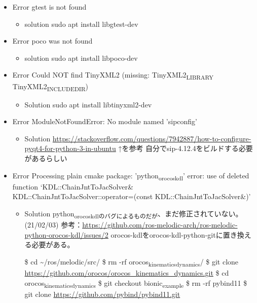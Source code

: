 \documentclass[11pt]{article}
\begin{document}
\begin{itemize}
\item Error
gtest is not found

\begin{itemize}
\item solution
sudo apt install libgtest-dev
\end{itemize}

\item Error
poco was not found

\begin{itemize}
\item solution
sudo apt install libpoco-dev
\end{itemize}

\item Error
Could NOT find TinyXML2 (missing: TinyXML2\textsubscript{LIBRARY} TinyXML2\textsubscript{INCLUDE}\textsubscript{DIR})

\begin{itemize}
\item Solution
sudo apt install libtinyxml2-dev
\end{itemize}

\item Error
ModuleNotFoundError: No module named 'sipconfig'

\begin{itemize}
\item Solution
\url{https://stackoverflow.com/questions/7942887/how-to-configure-pyqt4-for-python-3-in-ubuntu}
↑を参考
自分でsip-4.12.4をビルドする必要があるらしい
\end{itemize}

\item Error
Processing plain cmake package: 'python\textsubscript{orocos}\textsubscript{kdl}'
error: use of deleted function ‘KDL::ChainJntToJacSolver\& KDL::ChainJntToJacSolver::operator=(const KDL::ChainJntToJacSolver\&)’

\begin{itemize}
\item Solution
python\textsubscript{orocos}\textsubscript{kdlのバグによるものだが}、まだ修正されていない。(21/02/03)
参考：\url{https://github.com/ros-melodic-arch/ros-melodic-python-orocos-kdl/issues/2}
orocos-kdlをorocos-kdl-python-gitに置き換える必要がある。

\$ cd \textasciitilde{}/ros/melodic/src/
\$ rm -rf orocos\textsubscript{kinematics}\textsubscript{dynamics}/
\$ git clone \url{https://github.com/orocos/orocos\_kinematics\_dynamics.git}
\$ cd orocos\textsubscript{kinematics}\textsubscript{dynamics}
\$ git checkout bionic\textsubscript{example}
\$ rm -rf pybind11
\$ git clone \url{https://github.com/pybind/pybind11.git}
\end{itemize}


\end{itemize}
\end{document}
